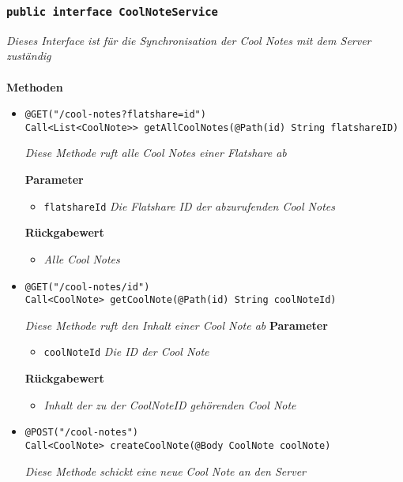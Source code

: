 	\subsubsection{\texttt{public interface CoolNoteService }}
\textit{Dieses Interface ist für die Synchronisation der Cool Notes mit dem Server zuständig}\\
\\
	\textbf{Methoden} 
		\begin{itemize}
		\item\texttt{{@GET("/cool-notes?flatshare={id}")\\ Call<List<CoolNote>> getAllCoolNotes(@Path(\grqq id\grqq) String flatshareID)}}

		\textit{Diese Methode ruft alle Cool Notes einer Flatshare ab}

	\textbf{Parameter} 
			\begin{itemize}
				\item\texttt{flatshareId}
		 		\textit{Die Flatshare ID der abzurufenden Cool Notes}
	 		\end{itemize}
	 		
		\textbf{Rückgabewert} 
	\begin{itemize}
			\item\textit{Alle Cool Notes}
	 	\end{itemize}
	

      \item\texttt{{@GET("/cool-notes/{id}")\\ Call<CoolNote> getCoolNote(@Path(\grqq id\grqq) String coolNoteId)}}

		\textit{Diese Methode ruft den Inhalt einer Cool Note ab }
	\textbf{Parameter} 
			\begin{itemize}
				\item\texttt{coolNoteId}
		 		\textit{Die ID der Cool Note}
	 		\end{itemize}

		\textbf{Rückgabewert} 
		\begin{itemize}
			\item\textit{Inhalt der zu der CoolNoteID gehörenden Cool Note}
	 	\end{itemize}	

      \item\texttt{{@POST("/cool-notes")\\ Call<CoolNote> createCoolNote(@Body CoolNote coolNote)}}

		\textit{Diese Methode schickt eine neue Cool Note an den Server }


\end{itemize}
